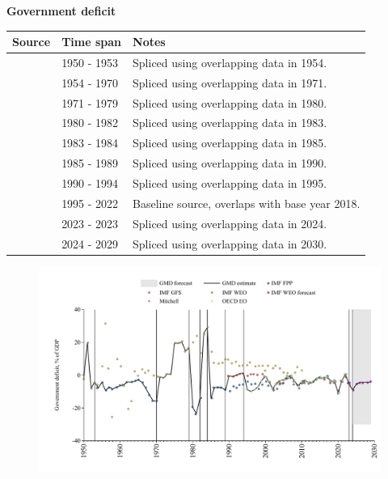 \documentclass[12pt,a4paper,landscape]{article}
\begin{document}
\begin{adjustbox}{max totalsize={\paperwidth}{\paperheight},center}
\begin{minipage}[t][\textheight][t]{\textwidth}
\vspace*{0.5cm}
{}
\begin{center}
{\Large\bfseries Government deficit}
\end{center}
\vspace{0.5cm}
\begin{table}[H]
\centering
\small
\begin{tabular}{|l|l|l|}
\hline
\textbf{Source} & \textbf{Time span} & \textbf{Notes} \\
\hline
\rowcolor{white}\cite{Mitchell}& 1950 - 1953 &Spliced using overlapping data in 1954. \\
\rowcolor{lightgray}\cite{IMF_FPP}& 1954 - 1970 &Spliced using overlapping data in 1971. \\
\rowcolor{white}\cite{Mitchell}& 1971 - 1979 &Spliced using overlapping data in 1980. \\
\rowcolor{lightgray}\cite{IMF_FPP}& 1980 - 1982 &Spliced using overlapping data in 1983. \\
\rowcolor{white}\cite{Mitchell}& 1983 - 1984 &Spliced using overlapping data in 1985. \\
\rowcolor{lightgray}\cite{IMF_FPP}& 1985 - 1989 &Spliced using overlapping data in 1990. \\
\rowcolor{white}\cite{IMF_GFS}& 1990 - 1994 &Spliced using overlapping data in 1995. \\
\rowcolor{lightgray}\cite{OECD_EO}& 1995 - 2022 &Baseline source, overlaps with base year 2018. \\
\rowcolor{white}\cite{IMF_GFS}& 2023 - 2023 &Spliced using overlapping data in 2024. \\
\rowcolor{lightgray}\cite{IMF_WEO_forecast}& 2024 - 2029 &Spliced using overlapping data in 2030. \\
\hline
\end{tabular}
\end{table}
\begin{figure}[H]
\centering
\includegraphics[width=\textwidth,height=0.6\textheight,keepaspectratio]{graphs/ISR_govdef_GDP.pdf}
\end{figure}
\end{minipage}
\end{adjustbox}
\end{document}
